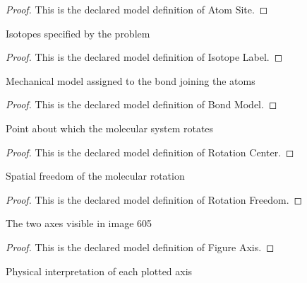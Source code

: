 \begin{proof}
  This is the declared model definition of Atom Site.
\end{proof}
\begin{definition}
  \label{def:physics:phyx-mini-0605:phyxminiproblems-problemphyxmini0605-isotopelabel}
  Isotopes specified by the problem
\end{definition}
\begin{proof}
  This is the declared model definition of Isotope Label.
\end{proof}
\begin{definition}
  \label{def:physics:phyx-mini-0605:phyxminiproblems-problemphyxmini0605-bondmodel}
  Mechanical model assigned to the bond joining the atoms
\end{definition}
\begin{proof}
  This is the declared model definition of Bond Model.
\end{proof}
\begin{definition}
  \label{def:physics:phyx-mini-0605:phyxminiproblems-problemphyxmini0605-rotationcenter}
  Point about which the molecular system rotates
\end{definition}
\begin{proof}
  This is the declared model definition of Rotation Center.
\end{proof}
\begin{definition}
  \label{def:physics:phyx-mini-0605:phyxminiproblems-problemphyxmini0605-rotationfreedom}
  Spatial freedom of the molecular rotation
\end{definition}
\begin{proof}
  This is the declared model definition of Rotation Freedom.
\end{proof}
\begin{definition}
  \label{def:physics:phyx-mini-0605:phyxminiproblems-problemphyxmini0605-figureaxis}
  The two axes visible in image 605
\end{definition}
\begin{proof}
  This is the declared model definition of Figure Axis.
\end{proof}
\begin{definition}
  \label{def:physics:phyx-mini-0605:phyxminiproblems-problemphyxmini0605-spectrumaxisquantity}
  Physical interpretation of each plotted axis
\end{definition}
